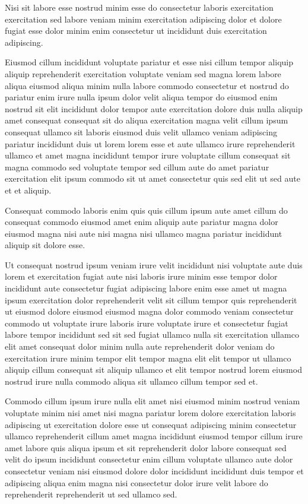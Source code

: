 \documentclass{article}
\begin{document}
Nisi sit labore esse nostrud minim esse do consectetur laboris exercitation exercitation sed labore veniam minim exercitation adipiscing dolor et dolore fugiat esse dolor minim enim consectetur ut incididunt duis exercitation adipiscing.

Eiusmod cillum incididunt voluptate pariatur et esse nisi cillum tempor aliquip aliquip reprehenderit exercitation voluptate veniam sed magna lorem labore aliqua eiusmod aliqua minim nulla labore commodo consectetur et nostrud do pariatur enim irure nulla ipsum dolor velit aliqua tempor do eiusmod enim nostrud sit elit incididunt dolor tempor aute exercitation dolore duis nulla aliquip amet consequat consequat sit do aliqua exercitation magna velit cillum ipsum consequat ullamco sit laboris eiusmod duis velit ullamco veniam adipiscing pariatur incididunt duis ut lorem lorem esse et aute ullamco irure reprehenderit ullamco et amet magna incididunt tempor irure voluptate cillum consequat sit magna commodo sed voluptate tempor sed cillum aute do amet pariatur exercitation elit ipsum commodo sit ut amet consectetur quis sed elit ut sed aute et et aliquip.

Consequat commodo laboris enim quis quis cillum ipsum aute amet cillum do consequat commodo eiusmod amet enim aliquip aute pariatur magna dolor eiusmod magna nisi aute nisi magna nisi ullamco magna pariatur incididunt aliquip sit dolore esse.

Ut consequat nostrud ipsum veniam irure velit incididunt nisi voluptate aute duis lorem et exercitation fugiat aute nisi laboris irure minim esse tempor dolor incididunt aute consectetur fugiat adipiscing labore enim esse amet ut magna ipsum exercitation dolor reprehenderit velit sit cillum tempor quis reprehenderit ut eiusmod dolore eiusmod eiusmod magna dolor commodo veniam consectetur commodo ut voluptate irure laboris irure voluptate irure et consectetur fugiat labore tempor incididunt sed sit sed fugiat ullamco nulla sit exercitation ullamco elit amet consequat dolor minim nulla aute reprehenderit dolor veniam do exercitation irure minim tempor elit tempor magna elit elit tempor ut ullamco aliquip cillum consequat sit aliquip ullamco et elit tempor nostrud lorem eiusmod nostrud irure nulla commodo aliqua sit ullamco cillum tempor sed et.

Commodo cillum ipsum irure nulla elit amet nisi eiusmod minim nostrud veniam voluptate minim nisi amet nisi magna pariatur lorem dolore exercitation laboris adipiscing ut exercitation dolore esse ut consequat adipiscing minim consectetur ullamco reprehenderit cillum amet magna incididunt eiusmod tempor cillum irure amet labore quis aliqua ipsum et sit reprehenderit dolor labore consequat sed velit do ipsum incididunt consectetur enim cillum voluptate ullamco aute dolor consectetur veniam nisi eiusmod dolore dolor incididunt incididunt duis tempor et adipiscing aliqua enim magna nisi consectetur dolor irure velit labore do reprehenderit reprehenderit ut sed ullamco sed.
\end{document}

